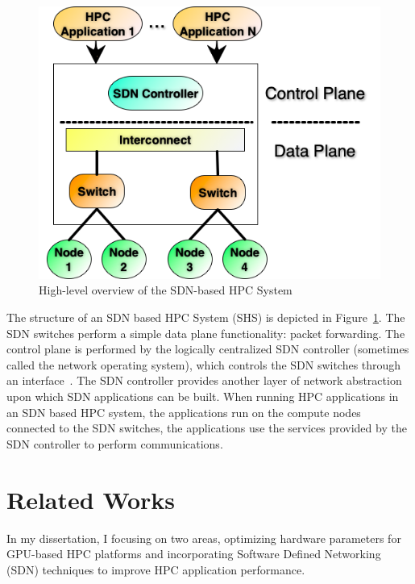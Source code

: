 \begin{figure}[h!]
  \centering
  \includegraphics[width=0.8\columnwidth]{./figs/Fig1.png}
  \caption{High-level overview of the SDN-based HPC System}
  \label{fig:sdn_hpc}
\end{figure}

The structure of an SDN based HPC System (SHS) is depicted in Figure~\ref{fig:sdn_hpc}.
The SDN switches perform a simple data plane functionality: packet forwarding. The
control plane is performed by the logically centralized
SDN controller (sometimes called the network operating system), which controls
the SDN switches through an interface~\cite{benzekki2016software}.
The SDN controller provides another layer of network abstraction upon which SDN
applications can be built. When running HPC applications in an SDN based HPC system,
the applications run on the compute nodes connected to the SDN switches,
the applications use the services provided by the SDN controller to perform
communications.




\clearpage
\section{Related Works}
In my dissertation, I focusing on two areas, optimizing hardware parameters for GPU-based HPC platforms 
and incorporating Software Defined Networking (SDN) techniques to improve HPC application performance.

